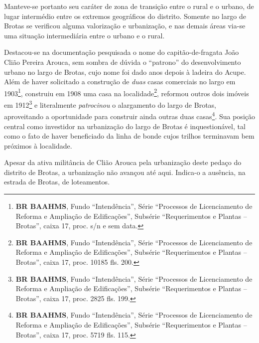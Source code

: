 
Manteve-se portanto seu caráter de zona de transição entre o rural e o urbano, de lugar intermédio entre os extremos geográficos do distrito. Somente no largo de Brotas se verificou alguma valorização e urbanização, e nas demais áreas via-se uma situação intermediária entre o urbano e o rural.





Destacou-se na documentação pesquisada o nome do capitão-de-fragata João Clião Pereira Arouca, sem sombra de dúvida o ``patrono'' do desenvolvimento urbano no largo de Brotas, cujo nome foi dado anos depois à ladeira do Acupe. Além de haver solicitado a construção de \textit{duas} casas comerciais no largo em 1903\footnote{\textbf{BR BAAHMS}, Fundo ``Intendência'', Série ``Processos de Licenciamento de Reforma e Ampliação de Edificações'', Subsérie ``Requerimentos e Plantas -- Brotas'', caixa 17, proc. s/n e sem data.}, construiu em 1908 uma casa na localidade\footnote{\textbf{BR BAAHMS}, Fundo ``Intendência'', Série ``Processos de Licenciamento de Reforma e Ampliação de Edificações'', Subsérie ``Requerimentos e Plantas -- Brotas'', caixa 17, proc. 10185 fls. 200.}, reformou outros dois imóveis em 1912\footnote{\textbf{BR BAAHMS}, Fundo ``Intendência'', Série ``Processos de Licenciamento de Reforma e Ampliação de Edificações'', Subsérie ``Requerimentos e Plantas -- Brotas'', caixa 17, proc. 2825 fls. 199.} e literalmente \textit{patrocinou} o alargamento do largo de Brotas, aproveitando a oportunidade para construir ainda outras duas casas\footnote{\textbf{BR BAAHMS}, Fundo ``Intendência'', Série ``Processos de Licenciamento de Reforma e Ampliação de Edificações'', Subsérie ``Requerimentos e Plantas -- Brotas'', caixa 17, proc. 5719 fls. 115.}. Sua posição central como investidor na urbanização do largo de Brotas é inquestionável, tal como o fato de haver beneficiado da linha de bonde cujos trilhos terminavam bem próximos à localidade.


Apesar da ativa militância de Clião Arouca pela urbanização deste pedaço do distrito de Brotas, a urbanização não avançou até aqui. Indica-o a ausência, na estrada de Brotas, de loteamentos. 


